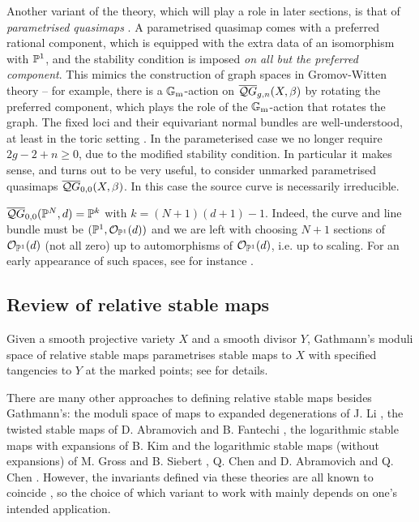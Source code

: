 Another variant of the theory, which will play a role in later sections, is that of \emph{parametrised quasimaps} \cite[\S 7]{CF-K}. A parametrised quasimap comes with a preferred rational component, which is equipped with the extra data of an isomorphism with $\mathbb P^1$, and the stability condition is imposed \emph{on all but the preferred component}. This mimics the construction of graph spaces in Gromov-Witten theory -- for example, there is a $\mathbb{G}_{\text{m}}$-action on $\overline{\mathcal QG}_{g,n}(X,\beta)$ by rotating the preferred component, which plays the role of the $\mathbb{G}_{\text{m}}$-action that rotates the graph. The fixed loci and their equivariant normal bundles are well-understood, at least in the toric setting \cite[\S 7]{CF-K}.  In the parameterised case we no longer require $2g-2+n\geq 0$, due to the modified stability condition. In particular it makes sense, and turns out to be very useful, to consider unmarked parametrised quasimaps $\overline{\mathcal QG}_{0,0}(X,\beta)$. In this case the source curve is necessarily irreducible. 


\begin{example} $\overline{\mathcal QG}_{0,0}(\mathbb P^N,d) = \mathbb P^k$ with $k=(N+1)(d+1)-1$. Indeed, the curve and line bundle must be $(\mathbb P^1,\mathcal O_{\mathbb P^1}(d))$ and we are left with choosing $N+1$ sections of $\mathcal O_{\mathbb P^1}(d)$ (not all zero) up to automorphisms of $\mathcal O_{\mathbb P^1}(d)$, i.e. up to scaling. For an early appearance of such spaces, see for instance \cite{Bertram}.\end{example}

\subsection{Review of relative stable maps} \label{Subsection relative stable maps} Given a smooth projective variety $X$ and a smooth divisor $Y$, Gathmann's moduli space of relative stable maps parametrises stable maps to $X$ with specified tangencies to $Y$ at the marked points; see \cite{Ga} for details.

\begin{remark} There are many other approaches to defining relative stable maps besides Gathmann's: the moduli space of maps to expanded degenerations of J. Li \cite{Li1} \cite{Li2}, the twisted stable maps of D. Abramovich and B. Fantechi \cite{AbramovichFantechi}, the logarithmic stable maps with expansions of B. Kim \cite{KimLog} and the logarithmic stable maps (without expansions) of M. Gross and B. Siebert \cite{GrossSiebertLog} \cite{GrossSiebertIntrinsic}, Q. Chen \cite{ChenLog} and D. Abramovich and Q. Chen \cite{AbramovichChenLog}. However, the invariants defined via these theories are all known to coincide \cite{AbramovichMarcusWiseComparison}, so the choice of which variant to work with mainly depends on one's intended application. \end{remark}


